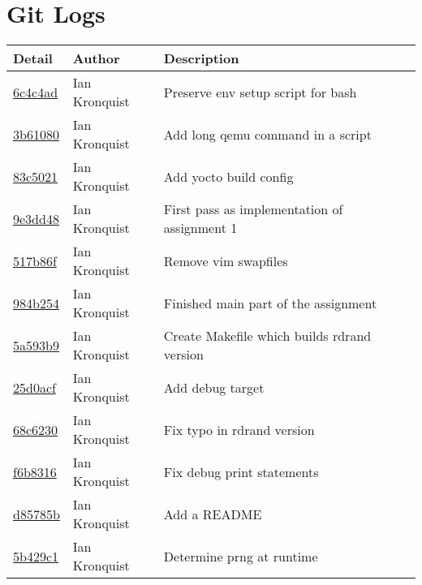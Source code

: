 \documentclass[10pt,conference,draftclsnofoot,onecolumn]{IEEEtran}
\begin{document}
\bigskip
\bigskip

\section{Git Logs}
\begin{tabular}{l l l}\textbf{Detail} & \textbf{Author} & \textbf{Description}\\ \hline\href{git@github.com:iankronquist/cs444/commit/6c4c4ad85b24e29c66726d07a80b0d9b05791010}{6c4c4ad} & Ian Kronquist & Preserve env setup script for bash\\\hline
\href{git@github.com:iankronquist/cs444/commit/3b610803bb893ba4d4c2bf7fc0ed67306e884456}{3b61080} & Ian Kronquist & Add long qemu command in a script\\\hline
\href{git@github.com:iankronquist/cs444/commit/83c50214d9dd20bfd3cc722178af0a18bc4d1497}{83c5021} & Ian Kronquist & Add yocto build config\\\hline
\href{git@github.com:iankronquist/cs444/commit/9e3dd48a769717e235ec85308267d1b6db4e95bf}{9e3dd48} & Ian Kronquist & First pass as implementation of assignment 1\\\hline
\href{git@github.com:iankronquist/cs444/commit/517b86ff39f3a9e738eb940cf5833c2f0b97cb43}{517b86f} & Ian Kronquist & Remove vim swapfiles\\\hline
\href{git@github.com:iankronquist/cs444/commit/984b2540a9ed74f5042680ddedfc52038284e6d7}{984b254} & Ian Kronquist & Finished main part of the assignment\\\hline
\href{git@github.com:iankronquist/cs444/commit/5a593b9919d77a4e071d5b2397bb494003ce8a37}{5a593b9} & Ian Kronquist & Create Makefile which builds rdrand version\\\hline
\href{git@github.com:iankronquist/cs444/commit/25d0acf4229a54bf6bc5207be44677f41589cfc1}{25d0acf} & Ian Kronquist & Add debug target\\\hline
\href{git@github.com:iankronquist/cs444/commit/68c6230302be556de31b395f8c14b650b16b8039}{68c6230} & Ian Kronquist & Fix typo in rdrand version\\\hline
\href{git@github.com:iankronquist/cs444/commit/f6b831677fdf90ec9658466e6afe8fbd75d31177}{f6b8316} & Ian Kronquist & Fix debug print statements\\\hline
\href{git@github.com:iankronquist/cs444/commit/d85785b20039eac76880d1f86105e9f8d03e3895}{d85785b} & Ian Kronquist & Add a README\\\hline
\href{git@github.com:iankronquist/cs444/commit/5b429c1763541f159d23490d3b12166302cefc10}{5b429c1} & Ian Kronquist & Determine prng at runtime\\\hline

\end{tabular}
\end{document}
